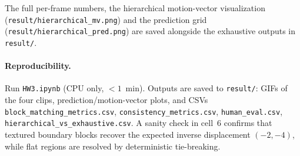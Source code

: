 \documentclass[10pt,a4paper]{article}
\begin{document}
The full per-frame numbers, the hierarchical motion-vector visualization (\texttt{result/hierarchical\_mv.png}) and the prediction grid (\texttt{result/hierarchical\_pred.png}) are saved alongside the exhaustive outputs in \texttt{result/}.

\paragraph{Reproducibility.} Run \texttt{HW3.ipynb} (CPU only, $<1$~min). Outputs are saved to \texttt{result/}: GIFs of the four clips, prediction/motion-vector plots, and CSVs \texttt{block\_matching\_metrics.csv}, \texttt{consistency\_metrics.csv}, \texttt{human\_eval.csv}, \texttt{hierarchical\_vs\_exhaustive.csv}. A sanity check in cell~6 confirms that textured boundary blocks recover the expected inverse displacement $(-2,-4)$, while flat regions are resolved by deterministic tie-breaking.
\end{document}

